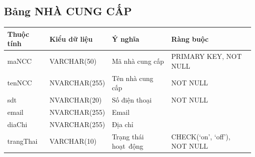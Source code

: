 \documentclass[a4paper,12pt]{report}
\begin{document}
\subsection{Bảng NHÀ CUNG CẤP}
\noindent
\begin{center}
    \begin{tabular}{|>{\centering\arraybackslash}p{3cm}|
        >{\centering\arraybackslash}p{4cm}|
        >{\centering\arraybackslash}p{4cm}|
        >{\centering\arraybackslash}p{4cm}|}
        \hline
        \textbf{Thuộc tính}                                                                                                               &
        \textbf{Kiểu dữ liệu}                                                                                                                             &
        \textbf{Ý nghĩa}                                                                                                 &
        \textbf{Ràng buộc}                                                                                                         \\
        \hline
        maNCC &  VARCHAR(50)  & Mã nhà cung cấp & PRIMARY KEY, NOT NULL \\
        \hline
        tenNCC &  NVARCHAR(255)  & Tên nhà cung cấp & NOT NULL \\                                                                                                                          
        \hline
        sdt & NVARCHAR(20) & Số điện thoại & NOT NULL \\                                                                                                                          
        \hline
        email & NVARCHAR(255) & Email &  \\                                                                                                                          
        \hline
        diaChi & NVARCHAR(255) & Địa chỉ & \\                                                                                                                          
        \hline
        trangThai &  VARCHAR(10)  & Trạng thái hoạt~động & CHECK(‘on’, ‘off’), NOT NULL \\
        \hline
    \end{tabular}
\end{center}
\end{document}

